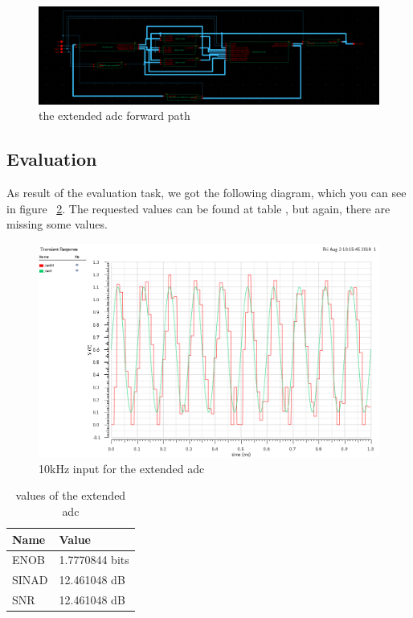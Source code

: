 \begin{figure}[h]
	\centering
	\includegraphics[scale=0.225]{images/adc/adcForwardExtended.png}
	\caption{the extended adc forward path}
	\label{fig:extendedForward}
\end{figure}


\subsection{Evaluation}

As result of the evaluation task, we got the following diagram, which you can see in figure ~\ref{fig:extendedAdcEvaluation}. The requested values can be found at table , but again, there are missing some values.


\begin{figure}[h]
	\centering
	\includegraphics[scale=0.5]{images/adc/input10kHzExtended.png}
	\caption{10kHz input for the extended adc}
	\label{fig:extendedAdcEvaluation}
\end{figure}

\begin{table}[!h]
	\centering
	\begin{tabular}{|l|l|}
		\hline
		Name & Value \\
		\hline
		ENOB & 1.7770844 bits \\
		SINAD & 12.461048 dB \\
		SNR & 12.461048 dB \\
		\hline
	\end{tabular}
	\caption{values of the extended adc}
	\label{table:valuesExtendedADC}
\end{table}